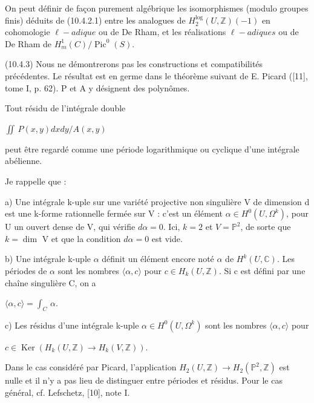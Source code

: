 \documentclass[11pt,twoside]{article}
\newcommand{\DFormula}[1]{%
  \par\smallskip\noindent\hspace*{0pt}\(\displaystyle #1\)\par\smallskip
}
\begin{document}
On peut définir de façon purement algébrique les isomorphismes (modulo groupes finis) déduits de (10.4.2.1) entre les analogues de \(H_{2}^{\operatorname{log}}(U,\mathbb{Z})(−1)\) en cohomologie \(\ell -adique\) ou de De Rham, et les réalisations \(\ell -adiques\) ou de De Rham de \(H_{m}^{1}(C)/\operatorname{Pic}^{0}(S)\).\par
\par\medskip
(10.4.3) Nous ne démontrerons pas les constructions et compatibilités précédentes. Le résultat est en germe dans le théorème suivant de E. Picard ([11], tome I, p. 62). P et A y désignent des polynômes.\par
\par\medskip
Tout résidu de l’intégrale double\par
\par\medskip
\DFormula{∬\,P(x,y)dxdy/A(x,y)}
\par\medskip
peut être regardé comme une période logarithmique ou cyclique d’une intégrale abélienne.\par
\par\medskip
Je rappelle que :\par
\par\medskip
a) Une intégrale k-uple sur une variété projective non singulière V de dimension d est une k-forme rationnelle fermée sur V : c’est un élément \(\alpha \in H^{0}(U,\Omega ^{k})\), pour U un ouvert dense de V, qui vérifie \(d\alpha =0\). Ici, \(k=2\) et \(V=ℙ^{2}\), de sorte que \(k=\operatorname{dim}\) V et que la condition \(d\alpha =0\) est vide.\par
\par\medskip
b) Une intégrale k-uple \(\alpha \) définit un élément encore noté \(\alpha \) de \(H^{k}(U,\mathbb{C})\). Les périodes de \(\alpha \) sont les nombres \(⟨\alpha ,c⟩\) pour \(c\in H_{k}(U,\mathbb{Z})\). Si c est défini par une chaîne singulière C, on a\par
\par\medskip
\DFormula{⟨\alpha ,c⟩=∫_{C}\,\alpha .}
\par\medskip
c) Les résidus d’une intégrale k-uple \(\alpha \in H^{0}(U,\Omega ^{k})\) sont les nombres \(⟨\alpha ,c⟩\) pour\par
\par\medskip
\DFormula{c\in \operatorname{Ker}(H_{k}(U,\mathbb{Z})\to H_{k}(V,\mathbb{Z})).}
\par\medskip
Dans le cas considéré par Picard, l’application \(H_{2}(U,\mathbb{Z})\to H_{2}(ℙ^{2},\mathbb{Z})\) est nulle et il n’y a pas lieu de distinguer entre périodes et résidus. Pour le cas général, cf. Lefschetz, [10], note I.\par
\end{document}
